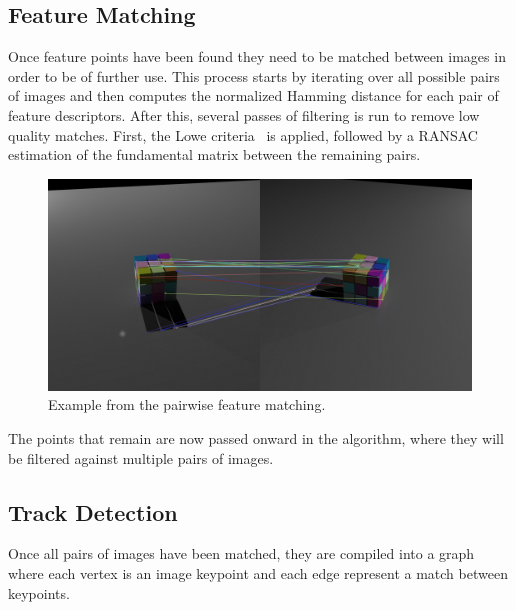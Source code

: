 \documentclass[preprint,acmtog]{acmart}
\begin{document}
\subsection{Feature Matching}

Once feature points have been found they need to be matched between images in
order to be of further use. This process starts by iterating over all possible
pairs of images and then computes the normalized Hamming distance for each pair
of feature descriptors. After this, several passes of filtering is run to remove
low quality matches. First, the Lowe criteria~\cite{sift2004} is applied,
followed by a RANSAC~\cite{ransac} estimation of the fundamental matrix between
the remaining pairs.

\begin{figure}[ht]
  \centering
  \includegraphics[width=1.0\linewidth]{matches_3}
  \caption{Example from the pairwise feature matching.}
\end{figure}



The points that remain are now passed onward in the algorithm, where they will
be filtered against multiple pairs of images.


\subsection{Track Detection}

Once all pairs of images have been matched, they are compiled into a graph where
each vertex is an image keypoint and each edge represent a match between
keypoints.
\end{document}
